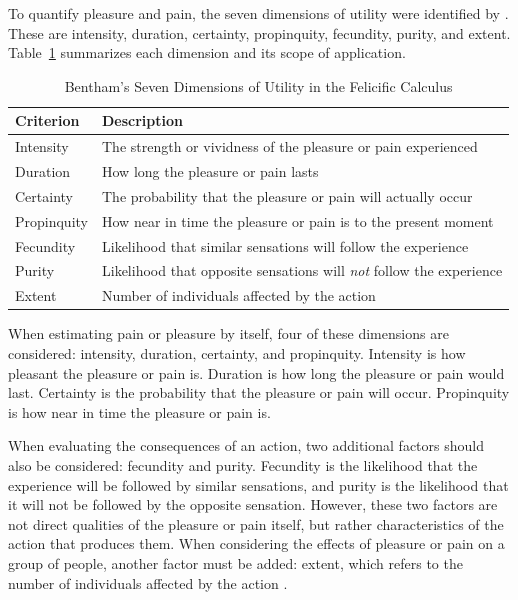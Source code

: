 \documentclass{icsthesis}
\begin{document}
\begin{mainmatter}
To quantify pleasure and pain, the seven dimensions of utility were identified by \citet{Bentham1907}. These are intensity, duration, certainty, propinquity, fecundity, purity, and extent. Table~\ref{table:felicific-criteria} summarizes each dimension and its scope of application.

		\begin{table}[H]
		\vspace{2ex}
		\centering
		\caption{Bentham's Seven Dimensions of Utility in the Felicific Calculus}
		\label{table:felicific-criteria}
		\footnotesize
		\renewcommand{\arraystretch}{1.3}
		\begin{tabular}{
			>{\raggedright\arraybackslash}p{2.4cm}
			>{\raggedright\arraybackslash}p{10.0cm}
		}
		\hline\hline
		\textbf{Criterion} & \textbf{Description} \\
		\hline
		Intensity    & The strength or vividness of the pleasure or pain experienced \\
		Duration     & How long the pleasure or pain lasts \\
		Certainty    & The probability that the pleasure or pain will actually occur \\
		Propinquity  & How near in time the pleasure or pain is to the present moment \\
		\hline
		Fecundity    & Likelihood that similar sensations will follow the experience \\
		Purity       & Likelihood that opposite sensations will \textit{not} follow the experience \\
		\hline
		Extent       & Number of individuals affected by the action \\
		\hline
		\end{tabular}
		\par\smallskip

		\end{table}

When estimating pain or pleasure by itself, four of these dimensions are considered: intensity, duration, certainty, and propinquity. Intensity is how pleasant the pleasure or pain is. Duration is how long the pleasure or pain would last. Certainty is the probability that the pleasure or pain will occur. Propinquity is how near in time the pleasure or pain is.

When evaluating the consequences of an action, two additional factors should also be considered: fecundity and purity. Fecundity is the likelihood that the experience will be followed by similar sensations, and purity is the likelihood that it will not be followed by the opposite sensation. However, these two factors are not direct qualities of the pleasure or pain itself, but rather characteristics of the action that produces them. When considering the effects of pleasure or pain on a group of people, another factor must be added: extent, which refers to the number of individuals affected by the action  \citep{Bentham1907,Sprigge1999}.


\end{mainmatter}
\end{document}
